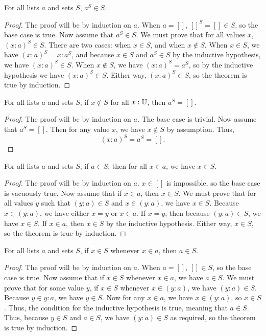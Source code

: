 \documentclass[../../math.tex]{subfiles}
\begin{document}
\begin{theorem} \label{list_prop_filter}
    For all lists $a$ and sets $S$, $a^S \in S$.
\end{theorem}
\begin{proof}
    The proof will be by induction on $a$.  When $a = []$, $[]^S = [] \in S$, so
    the base case is true.  Now assume that $a^S \in S$.  We must prove that for
    all values $x$, $(x : a)^S \in S$.  There are two cases: when $x \in S$, and
    when $x \notin S$.  When $x \in S$, we have $(x : a)^S = x : a^S$, and
    because $x \in S$ and $a^S \in S$ by the inductive hypothesis, we have $(x :
    a)^S \in S$.  When $x \notin S$, we have $(x : a)^S = a^S$, so by the
    inductive hypothesis we have $(x : a)^S \in S$.  Either way, $(x : a)^S \in
    S$, so the theorem is true by induction.
\end{proof}

\begin{theorem} \label{list_prop_filter_empty}
    For all lists $a$ and sets $S$, if $x \notin S$ for all $x : \mathbb{U}$, then $a^S
    = []$.
\end{theorem}
\begin{proof}
    The proof will be by induction on $a$.  The base case is trivial.  Now
    assume that $a^S = []$.  Then for any value $x$, we have $x \notin S$ by
    assumption.  Thus,
    \[
        (x : a)^S = a^S = [].
    \]
\end{proof}

\begin{theorem} \label{list_prop_in}
    For all lists $a$ and sets $S$, if $a \in S$, then for all $x \in a$, we
    have $x \in S$.
\end{theorem}
\begin{proof}
    The proof will be by induction on $a$.  $x \in []$ is impossible, so the
    base case is vacuously true.  Now assume that if $x \in a$, then $x \in S$.
    We must prove that for all values $y$ such that $(y : a) \in S$ and $x \in
    (y : a)$, we have $x \in S$.  Because $x \in (y : a)$, we have either $x =
    y$ or $x \in a$.  If $x = y$, then because $(y : a) \in S$, we have $x \in
    S$.  If $x \in a$, then $x \in S$ by the inductive hypothesis.  Either way,
    $x \in S$, so the theorem is true by induction.
\end{proof}

\begin{theorem} \label{list_in_prop}
    For all lists $a$ and sets $S$, if $x \in S$ whenever $x \in a$, then $a \in
    S$.
\end{theorem}
\begin{proof}
    The proof will be by induction on $a$.  When $a = []$, $[] \in S$, so the
    base case is true.  Now assume that if $x \in S$ whenever $x \in a$, we have
    $a \in S$.  We must prove that for some value $y$, if $x \in S$ whenever $x
    \in (y : a)$, we have $(y : a) \in S$.  Because $y \in y : a$, we have $y
    \in S$.  Now for any $x \in a$, we have $x \in (y : a)$, so $x \in S$.
    Thus, the condition for the inductive hypothesis is true, meaning that $a
    \in S$.  Thus, because $y \in S$ and $a \in S$, we have $(y : a) \in S$ as
    required, so the theorem is true by induction.
\end{proof}
\end{document}
